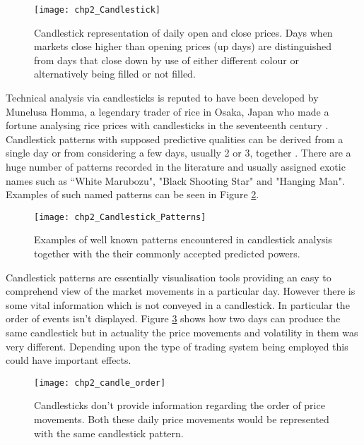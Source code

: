 \begin{figure}[tbph!]
\centering
\texttt{[image: chp2\_Candlestick]}
\caption[Candlestick representation of daily open and close prices]{Candlestick representation of daily open and close prices. Days when markets close higher than opening prices (up days) are distinguished from days that close down by use of either different colour or alternatively being filled or not filled.}
\label{fig:Candlestick}
\end{figure}

Technical analysis via candlesticks is reputed to have been developed by Munelusa Homma, a legendary trader of rice in Osaka, Japan who made a fortune analysing rice prices with candlesticks in the seventeenth century \citep{nison2001japanese}. Candlestick patterns with supposed predictive qualities can be derived from a single day or from considering a few days, usually 2 or 3, together \citep{bigalow2011profitable}. There are a huge number of patterns recorded in the literature and usually assigned exotic names such as \textquotedblleft White Marubozu", "Black Shooting Star" and "Hanging Man". Examples of such named patterns can be seen in Figure \ref{fig:Candlestick_Patterns}.

\begin{figure}[tbph!]
\centering
\texttt{[image: chp2\_Candlestick\_Patterns]}
\caption[Examples of well known candlestick patterns]{Examples of well known patterns encountered in candlestick analysis together with the their commonly accepted predicted powers.}
\label{fig:Candlestick_Patterns}
\end{figure}

Candlestick patterns are essentially visualisation tools providing an easy to comprehend view of the market movements in a particular day. However there is some vital information which is not conveyed in a candlestick. In particular the order of events isn't displayed. Figure \ref{fig:chp2_candle_order} shows how two days can produce the same candlestick but in actuality the price movements and volatility in them was very different. Depending upon the type of trading system being employed this could have important effects.

\begin{figure}[tbph!]
\centering
\texttt{[image: chp2\_candle\_order]}
\caption[Candlesticks and market movement.]{Candlesticks don't provide information regarding the order of price movements. Both these daily price movements would be represented with the same candlestick pattern.}
\label{fig:chp2_candle_order}
\end{figure}


